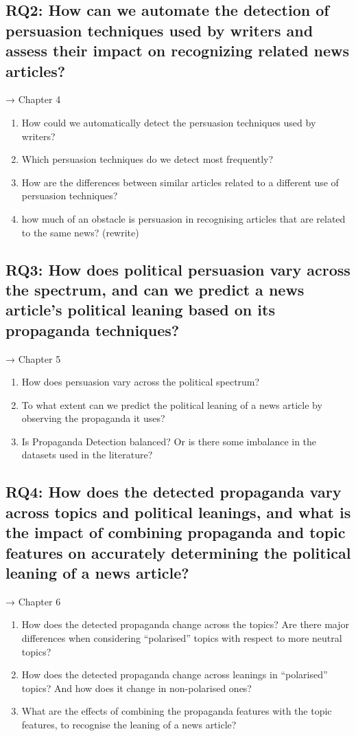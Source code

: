 \subsection{RQ2: How can we automate the detection of persuasion techniques used by writers and assess their impact on recognizing related news articles?}
→ Chapter 4
\begin{enumerate}[label={\textbf{RQ2.\arabic*:}},leftmargin=2cm]
    \item How could we automatically detect the persuasion techniques used by writers?
    \item Which persuasion techniques do we detect most frequently?
    \item How are the differences between similar articles related to a different use of persuasion techniques?
    \item how much of an obstacle is persuasion in recognising articles that are related to the same news? (rewrite)
\end{enumerate}

\subsection{RQ3: How does political persuasion vary across the spectrum, and can we predict a news article's political leaning based on its propaganda techniques?}
→ Chapter 5
\begin{enumerate}[label={\textbf{RQ3.\arabic*:}},leftmargin=2cm]
    \item How does persuasion vary across the political spectrum?
    \item To what extent can we predict the political leaning of a news article by observing the propaganda it uses?
    \item Is Propaganda Detection balanced? Or is there some imbalance in the datasets used in the literature?
\end{enumerate}

\subsection{RQ4: How does the detected propaganda vary across topics and political leanings, and what is the impact of combining propaganda and topic features on accurately determining the political leaning of a news article?}
→ Chapter 6
\begin{enumerate}[label={\textbf{RQ4.\arabic*:}},leftmargin=2cm]
    \item How does the detected propaganda change across the topics? Are there major differences when considering “polarised” topics with respect to more neutral topics?
    \item How does the detected propaganda change across leanings in “polarised” topics? And how does it change in non-polarised ones?
    \item What are the effects of combining the propaganda features with the topic features, to recognise the leaning of a news article?
\end{enumerate}


